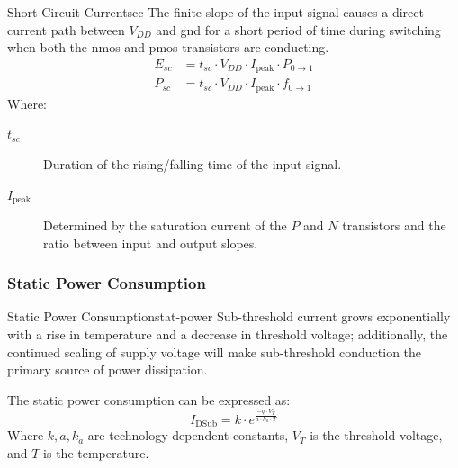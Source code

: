 \begin{definition}{Short Circuit Current}{scc}
    The finite slope of the input signal causes a direct current path between \(V_{DD}\) and \gls{gnd} for a short period of time during switching when both the \gls{nmos} and \gls{pmos} transistors are conducting.
    \begin{align*}
        E_{sc} &= t_{sc} \cdot V_{DD} \cdot I_{\text{peak}} \cdot P_{0\rightarrow 1}\\
        P_{sc} &= t_{sc} \cdot V_{DD} \cdot I_{\text{peak}} \cdot f_{0\rightarrow 1}
    \end{align*}
    Where:
    \begin{description}
        \item[\(t_{sc}\)] Duration of the rising/falling time of the input signal.
        \item[\(I_{\text{peak}}\)] Determined by the saturation current of the \(P\) and \(N\) transistors and the ratio between input and output slopes.
    \end{description}
\end{definition}

\subsubsection{Static Power Consumption}
\begin{definition}{Static Power Consumption}{stat-power}
    Sub-threshold current grows exponentially with a rise in temperature and a decrease in threshold voltage; additionally, the continued scaling of supply voltage will make sub-threshold conduction the primary source of power dissipation.
    
    The static power consumption can be expressed as:
    \[
        I_{\text{DSub}} = k \cdot e^{\frac{-q \cdot V_{T}}{a \cdot k_a \cdot T}}
    \]
    Where \(k, a, k_a\) are technology-dependent constants, \(V_T\) is the threshold voltage, and \(T\) is the temperature.
\end{definition}

